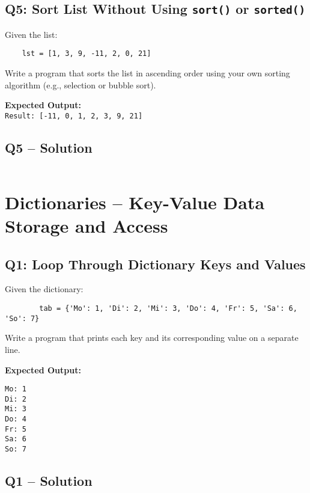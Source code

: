 \documentclass[a4paper,11pt]{article}
\begin{document}
\subsection*{Q5: Sort List Without Using \texttt{sort()} or \texttt{sorted()}}
Given the list:

\begin{verbatim}
	lst = [1, 3, 9, -11, 2, 0, 21]
\end{verbatim}

Write a program that sorts the list in ascending order using your own sorting algorithm (e.g., selection or bubble sort).

\textbf{Expected Output:}\\
\texttt{Result: [-11, 0, 1, 2, 3, 9, 21]}


\subsection*{Q5 – Solution}
\inputminted{python}{Files/7/5.py}


	\section{Dictionaries – Key-Value Data Storage and Access}
	
	\subsection*{Q1: Loop Through Dictionary Keys and Values}
	Given the dictionary:
	
	\begin{verbatim}
		tab = {'Mo': 1, 'Di': 2, 'Mi': 3, 'Do': 4, 'Fr': 5, 'Sa': 6, 'So': 7}
	\end{verbatim}
	
	Write a program that prints each key and its corresponding value on a separate line.
	
	\textbf{Expected Output:}
	\begin{flushleft}
		\texttt{Mo: 1\\Di: 2\\Mi: 3\\Do: 4\\Fr: 5\\Sa: 6\\So: 7}
	\end{flushleft}
	
	\subsection*{Q1 – Solution}
	\inputminted{python}{Files/8/1.py}
	
\end{document}
